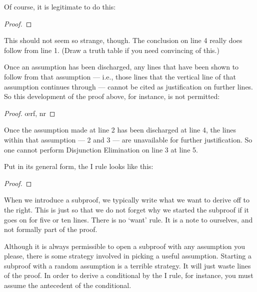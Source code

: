 Of course, it is legitimate to do this:

\begin{proof}
	\metaA{}
	\open
		\metaB{}
		 
	\close
	 
\end{proof}

This should not seem so strange, though. The conclusion on line 4 really does follow from line 1. (Draw a truth table if you need convincing of this.) 

Once an assumption has been discharged, any lines that have been shown to follow from that assumption --- i.e., those lines that the vertical line of that assumption continues through --- cannot be cited as justification on further lines. So this development of the proof above, for instance, is not permitted:

\begin{proof}
	\open
		\oe{rf, nr}
	\close
\end{proof}

Once the assumption made at line 2 has been discharged at line 4, the lines within that assumption --- 2 and 3 --- are unavailable for further justification. So one cannot perform Disjunction Elimination on line 3 at line 5.


Put in its general form, the {\eif}I rule looks like this:

\begin{proof}
	\open
		\metaA{} 
		\metaB{}
	\close
\end{proof}

When we introduce a subproof, we typically write what we want to derive off to the right. This is just so that we do not forget why we started the subproof if it goes on for five or ten lines. There is no `want' rule. It is a note to ourselves, and not formally part of the proof.

Although it is always permissible to open a subproof with any assumption you please, there is some strategy involved in picking a useful assumption. Starting a subproof with a random assumption is a terrible strategy. It will just waste lines of the proof. In order to derive a conditional by the {\eif}I rule, for instance, you must assume the antecedent of the conditional.

